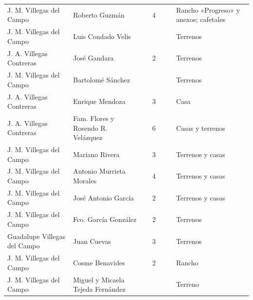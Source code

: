 \documentclass[14pt,twoside,final]{extbook} %
\begin{document}
{\begin{longtable}[c]{@{}p{2.5cm}lrSrrl@{}}
J. M. Villegas del Campo & Roberto Guzmán &  & 4 &  &  & Rancho «Progreso» y anexos; cafetales \\
J. M. Villegas del Campo & Luis Condado Velis &  & {} & {} & {} & Terrenos \\
J. A. Villegas Contreras & José Gandara &  & 2 &  &  & Terrenos \\
J. M. Villegas del Campo & Bartolomé Sánchez &  & {} &  &  & Terrenos \\
J. A. Villegas Contreras & Enrique Mendoza &  & 3 &  &  & Casa \\
J. A. Villegas Contreras & Fam. Flores y Rosendo R. Velázquez &  & 6 &  &  & Casas y terrenos \\
J. M. Villegas del Campo & Mariano Rivera &  & 3 &  &  & Terrenos y casas \\
J. M. Villegas del Campo & Antonio Murrieta Morales &  & 4 &  &  & Terrenos y casas \\
J. M. Villegas del Campo & José Antonio García &  & 2 &  &  & Terrenos y casas \\
J. M. Villegas del Campo & Fco. García González &  & 2 &  &  & Terrenos \\
Guadalupe Villegas del Campo & Juan Cuevas &  & 3 & {} & {} & Terrenos \\
J. M. Villegas del Campo & Cosme Benavides &  & 2 &  &  & Rancho \\
J. M. Villegas del Campo & Miguel y Micaela Tejeda Fernández &  & {} & {} & {} & Terreno \\

\end{longtable}}
\end{document}

